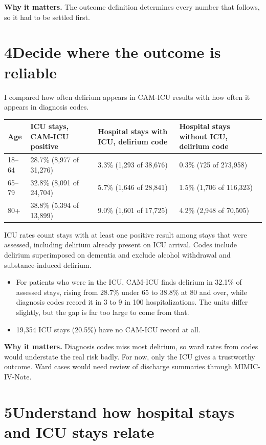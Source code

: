 \documentclass[11pt]{article}
\newcommand{\why}[1]{\begin{whynote}\textbf{\color{accent}Why it matters.} #1\end{whynote}}
\newcommand{\step}[2]{\section*{\color{accent}#1\quad\color{black}#2}}
\begin{document}
\why{The outcome definition determines every number that follows, so it had to be settled first.}

\step{4}{Decide where the outcome is reliable}

I compared how often delirium appears in CAM-ICU results with how often it appears in diagnosis codes.

\begin{center}
\small
\begin{tabularx}{\textwidth}{l X X X}
	\toprule
	Age & ICU stays, CAM-ICU positive & Hospital stays with ICU, delirium code & Hospital stays without ICU, delirium code \\
	\midrule
	18--64 & 28.7\% (8,977 of 31,276) & 3.3\% (1,293 of 38,676) & 0.3\% (725 of 273,958) \\
	65--79 & 32.8\% (8,091 of 24,704) & 5.7\% (1,646 of 28,841) & 1.5\% (1,706 of 116,323) \\
	80+ & 38.8\% (5,394 of 13,899) & 9.0\% (1,601 of 17,725) & 4.2\% (2,948 of 70,505) \\
	\bottomrule
\end{tabularx}
\end{center}

{\small\color{black!60}ICU rates count stays with at least one positive result among stays that were assessed, including delirium already present on ICU arrival. Codes include delirium superimposed on dementia and exclude alcohol withdrawal and substance-induced delirium.\par}

\begin{itemize}
	\item For patients who were in the ICU, CAM-ICU finds delirium in 32.1\% of assessed stays, rising from 28.7\% under 65 to 38.8\% at 80 and over, while diagnosis codes record it in 3 to 9 in 100 hospitalizations. The units differ slightly, but the gap is far too large to come from that.
	\item 19,354 ICU stays (20.5\%) have no CAM-ICU record at all.
\end{itemize}

\why{Diagnosis codes miss most delirium, so ward rates from codes would understate the real risk badly. For now, only the ICU gives a trustworthy outcome. Ward cases would need review of discharge summaries through MIMIC-IV-Note.}

\step{5}{Understand how hospital stays and ICU stays relate}
\end{document}
